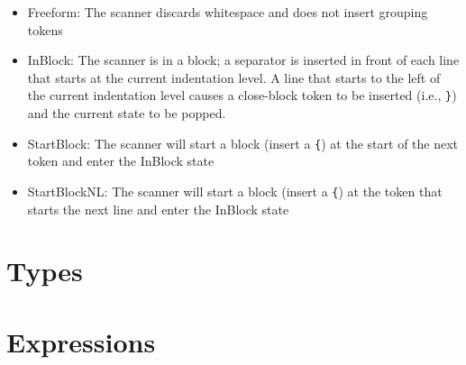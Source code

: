 \documentclass{article}
\begin{document}
\begin{itemize}

\item Freeform: The scanner discards whitespace and does not insert
  grouping tokens
  
\item InBlock: The scanner is in a block; a separator is inserted in
  front of each line that starts at the current indentation level.  A
  line that starts to the left of the current indentation level causes
  a close-block token to be inserted (i.e., \lstinline!}!) and the
    current state to be popped.
    
\item StartBlock: The scanner will start a block (insert a
  \lstinline!{!) at the start of the next token and enter the InBlock
    state
    
\item StartBlockNL: The scanner will start a block (insert a
  \lstinline!{!) at the token that starts the next line and enter the InBlock
    state

\end{itemize}

\section{Types}

\section{Expressions}
\end{document}
